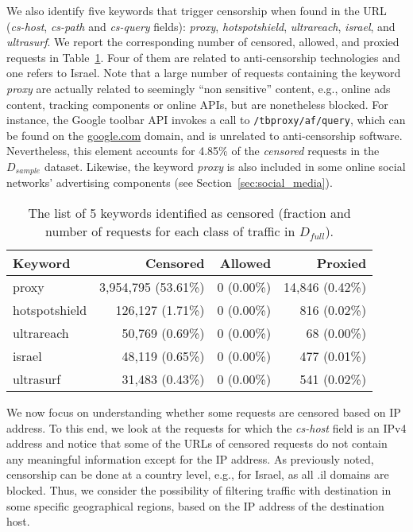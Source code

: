 \documentclass{sig-alternate-2013}
\newcommand{\descr}[1]{\smallskip\noindent{\bf #1}}
\def\df{$D_{full}$\xspace}
\def\ds{$D_{sample}$\xspace}
\begin{document}
\descr{Keyword-based Filtering.}
We also identify five keywords  that trigger censorship when found in the URL (\emph{cs-host}, \emph{cs-path} and \emph{cs-query} fields): {\em proxy}, {\em hotspotshield}, {\em ultrareach}, {\em israel}, and {\em ultrasurf}. We report the corresponding number of censored, allowed, and proxied requests in Table~\ref{tab:keyword_blacklist}. Four of them are related to anti-censorship technologies and one refers to Israel. 
Note that a large number of requests containing the keyword \emph{proxy} are actually related to seemingly ``non sensitive'' content, e.g., online ads content, tracking components or online APIs, but are nonetheless blocked. For instance, the Google toolbar API invokes a call to \texttt{/tbproxy/af/query}, which can be found on the \url{google.com} domain, and is unrelated to anti-censorship software. Nevertheless, this element accounts for 4.85\%  of the  \emph{censored} requests in the \ds dataset. Likewise, the keyword \emph{proxy} is also included in some online social networks' advertising components (see Section~\ref{sec:social_media}). 



\begin{table}[t!]
\small
\centering
\begin{tabular}{|l|r|r|r|} \hline
{\bf Keyword} & {\bf  Censored} & {\bf Allowed} & {\bf Proxied} \\ \hline
proxy & 3,954,795 (53.61\%) & 0 (0.00\%)  & 14,846 (0.42\%)  \\ 
hotspotshield &  126,127 (1.71\%) &   0 (0.00\%)& 816 (0.02\%) \\ 
ultrareach & 50,769 (0.69\%)  &  0 (0.00\%) & 68 (0.00\%)\\ 
israel & 48,119 (0.65\%) &  0 (0.00\%) &  477 (0.01\%) \\ 
ultrasurf & 31,483 (0.43\%)  &  0 (0.00\%) & 541 (0.02\%) \\ 
\hline
\end{tabular}
\caption{The list of 5 keywords identified as censored (fraction and number of requests for each class of traffic in \df). }
\label{tab:keyword_blacklist}
\end{table} 













\descr{IP-based censorship.} We now focus on understanding whether some requests are censored based on IP address. To this end, we look at the requests for which the {\em cs-host} field is an IPv4 address  
and notice that some of the URLs of censored requests do not contain any meaningful information except for the IP address. As previously noted, censorship can be done at a country level, e.g., for Israel, as all .il domains are blocked. Thus, we consider the possibility of filtering traffic with destination in some specific geographical regions, based on the IP address of the destination host. 
\end{document}
